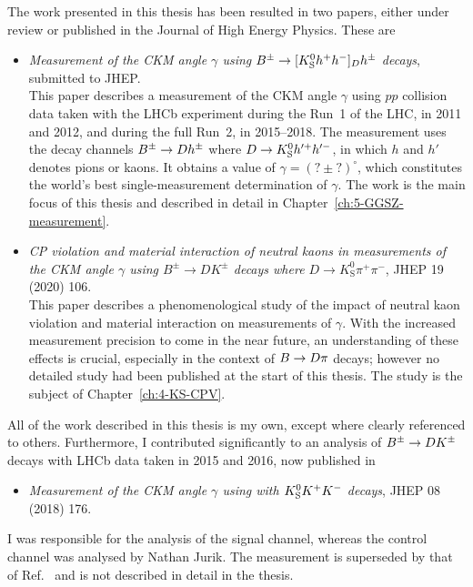 The work presented in this thesis has been resulted in two papers, either under review or published in the Journal of High Energy Physics. These are
\begin{itemize}

    \item [] \cite{GGSZ-B2Dh} \emph{Measurement of the CKM angle $\gamma$ using ${{B}^\pm}\rightarrow [{{K}^0_{\mathrm{S}}} h^+h^-]_{D} h^\pm$ decays}, submitted to JHEP. \\
    This paper describes a measurement of the CKM angle $\gamma$ using $pp$ collision data taken with the LHCb experiment during the Run~1 of the LHC, in 2011 and 2012, and during the full Run~2, in 2015--2018. The measurement uses the decay channels ${{B}^\pm}\rightarrow{\ensuremath{D}} h^\pm$ where ${D}\rightarrow{\ensuremath{{K}^0_{\mathrm{S}}}} h'^+h'^-$, in which $h$ and $h'$ denotes pions or kaons. It obtains a value of $\gamma = (?\pm?)^\circ$, which constitutes the world's best single-measurement determination of $\gamma$. The work is the main focus of this thesis and described in detail in Chapter~\ref{ch:5-GGSZ-measurement}.

    \item [] \cite{KsCPV} \emph{CP violation and material interaction of neutral kaons
                        in measurements of the CKM angle $\gamma$ using $B^\pm\to
                        DK^\pm$ decays where $D\to K_\text{S}^0\pi^+\pi^-$}, JHEP 19 (2020) 106. \\
                        This paper describes a phenomenological study of the impact of neutral kaon \CP violation and material interaction on measurements of $\gamma$. With the increased measurement precision to come in the near future, an understanding of these effects is crucial, especially in the context of ${B}\rightarrow{\ensuremath{D}}\pi$ decays; however no detailed study had been published at the start of this thesis. The study is the subject of Chapter~\ref{ch:4-KS-CPV}.
\end{itemize}
All of the work described in this thesis is my own, except where clearly referenced to others. Furthermore, I contributed significantly to an analysis of ${{B}^\pm}\rightarrow{\ensuremath{D}}{\ensuremath{{K}^\pm}}$ decays with LHCb data taken in 2015 and 2016, now published in
\begin{itemize}
    \item [] \cite{LHCb-PAPER-2018-017} \emph{Measurement of the CKM angle $\gamma$ using  with  ${{K}^0_{\mathrm{S}}} K^+K^-$ decays}, JHEP 08 (2018) 176.
\end{itemize}
I was responsible for the analysis of the signal channel, whereas the control channel was analysed by Nathan Jurik. The measurement is superseded by that of Ref.~\cite{GGSZ-B2Dh} and is not described in detail in the thesis.